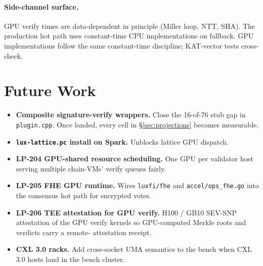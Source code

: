 \paragraph{Side-channel surface.} GPU verify times are
data-dependent in principle (Miller loop, NTT, SHA). The
production hot path uses constant-time CPU implementations on
fallback. GPU implementations follow the same constant-time
discipline; KAT-vector tests cross-check.

\section{Future Work}

\begin{itemize}[leftmargin=2em,nosep]
\item \textbf{Composite signature-verify wrappers.} Close the
  16-of-76 stub gap in \texttt{plugin.cpp}. Once landed, every
  cell in \S\ref{sec:projections} becomes measurable.
\item \textbf{\texttt{lux-lattice.pc} install on Spark.}
  Unblocks lattice GPU dispatch.
\item \textbf{LP-204 GPU-shared resource scheduling.} One GPU
  per validator host serving multiple chain-VMs' verify
  queues fairly.
\item \textbf{LP-205 FHE GPU runtime.} Wires \texttt{luxfi/fhe}
  and \texttt{accel/ops\_fhe.go} into the consensus hot path
  for encrypted votes.
\item \textbf{LP-206 TEE attestation for GPU verify.}
  H100 / GB10 SEV-SNP attestation of the GPU verify kernels so
  GPU-computed Merkle roots and verdicts carry a remote-
  attestation receipt.
\item \textbf{CXL 3.0 racks.} Add cross-socket UMA semantics to
  the bench when CXL 3.0 hosts land in the bench cluster.
\end{itemize}
